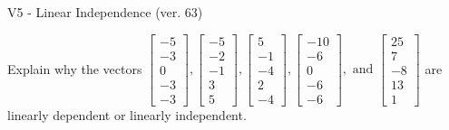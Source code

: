 \begin{exercise}
  \begin{exerciseTitle}V5 - Linear Independence (ver. 63)\end{exerciseTitle}
  \begin{exerciseStatement}
    Explain why the vectors \(\left[\begin{array}{r}
-5 \\
-3 \\
0 \\
-3 \\
-3
\end{array}\right] , \left[\begin{array}{r}
-5 \\
-2 \\
-1 \\
3 \\
5
\end{array}\right] , \left[\begin{array}{r}
5 \\
-1 \\
-4 \\
2 \\
-4
\end{array}\right] , \left[\begin{array}{r}
-10 \\
-6 \\
0 \\
-6 \\
-6
\end{array}\right] , \text{ and } \left[\begin{array}{r}
25 \\
7 \\
-8 \\
13 \\
1
\end{array}\right]\) are linearly dependent or linearly independent.	



\end{exerciseStatement}
\end{exercise}
